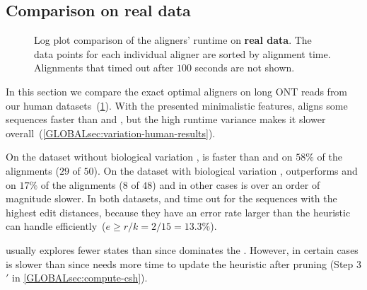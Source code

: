 \subsection{Comparison on real data} \label{GLOBALsec:evals-comparison-hg}

\begin{figure}[H]
  \centering
  \hfill
  \caption[Runtime per sequence (real data)]{Log plot comparison of the
  aligners' runtime on \textbf{real data}. The data points for each individual
  aligner are sorted by alignment time. Alignments that timed out after $100$
  seconds are not shown.}
  \label{GLOBALfig:human-results}
\end{figure}

In this section we compare the exact optimal aligners on long ONT reads from our
human datasets~(\cref{GLOBALfig:human-results}). With the presented minimalistic
features, \astarpa aligns some sequences faster than \wfa and \edlib, but the
high runtime variance makes it slower overall~(\cref{GLOBALsec:variation-human-results}).

On the dataset without biological variation \datasetOne, \SH is faster than \wfa
and \edlib on $58\%$ of the alignments ($29$ of $50$). On the dataset with
biological variation \datasetTwo, \SH outperforms \wfa and \edlib on $17\%$ of the
alignments ($8$ of $48$) and in other cases is over an order of magnitude
slower. In both datasets, \SH and \CSH time out for the sequences with the
highest edit distances, because they have an error rate larger than the
heuristic can handle efficiently~($e\geq r/k=2/15=13.3\%$).

\CSH usually explores fewer states than \SH since \csh dominates
the \sh. However, in certain cases \CSH is slower than \SH since needs more time
to update the heuristic after pruning (Step 3$'$ in \cref{GLOBALsec:compute-csh}).
